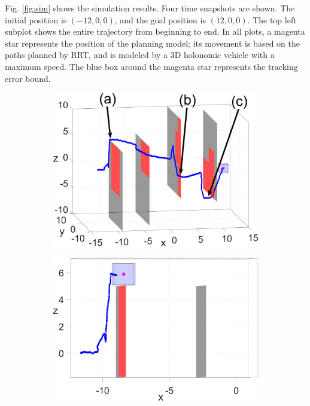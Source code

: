 Fig. \ref{fig:sim} shows the simulation results. Four time snapshots are shown. The initial position is $(-12, 0, 0)$, and the goal position is $(12, 0, 0)$. The top left subplot shows the entire trajectory from beginning to end. In all plots, a magenta star represents the position of the planning model; its movement is based on the paths planned by RRT, and is modeled by a 3D holonomic vehicle with a maximum speed. The blue box around the magenta star represents the tracking error bound.
\begin{figure}
	\centering
	\begin{subfigure}[t]{0.49\columnwidth} \label{subfig:sim_4}
		\includegraphics[width=\columnwidth]{fig/1173}
	\end{subfigure}  
	\begin{subfigure}[t]{0.49\columnwidth} \label{subfig:sim_1}
		\includegraphics[width=\columnwidth]{fig/224}
		\caption{}
	\end{subfigure}
	

\end{figure}
